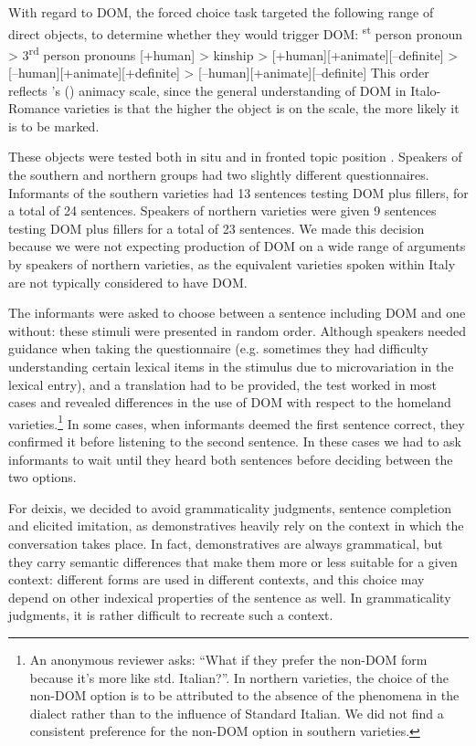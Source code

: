 \documentclass[output=paper,hidelinks]{langscibook}
\begin{document}
With regard to DOM, the forced choice task targeted the following range of direct objects, to determine whether they would trigger DOM: 
\textsuperscript{st} person pronoun > 3\textsuperscript{rd} person pronouns [+human] > kinship > [+human][+animate][--definite] > [--human][+animate][+definite] > [--human][+animate][--definite]
\z
This order reflects \citeauthor{Silverstein1976}’s (\citeyear{Silverstein1976}) animacy scale, since the general understanding of DOM in Italo-Romance varieties is that the higher the object is on the scale, the more likely it is to be marked.

These objects were tested both in situ and in fronted topic position \citep{Rizzi1997}. Speakers of the southern and northern groups had two slightly different questionnaires. Informants of the southern varieties had 13 sentences testing DOM plus fillers, for a total of 24 sentences. Speakers of northern varieties were given 9 sentences testing DOM plus fillers for a total of 23 sentences. We made this decision because we were not expecting production of DOM on a wide range of arguments by speakers of northern varieties, as the equivalent varieties spoken within Italy are not typically considered to have DOM.

The informants were asked to choose between a sentence including DOM and one without: these stimuli were presented in random order. Although speakers needed guidance when taking the questionnaire (e.g. sometimes they had difficulty understanding certain lexical items in the stimulus due to microvariation in the lexical entry), and a translation had to be provided, the test worked in most cases and revealed differences in the use of DOM with respect to the homeland varieties.\footnote{An anonymous reviewer asks: ``What if they prefer the non-DOM form because it’s more like std. Italian?''. In northern varieties, the choice of the non-DOM option is to be attributed to the absence of the phenomena in the dialect rather than to the influence of Standard Italian. We did not find a consistent preference for the non-DOM option in southern varieties.} In some cases, when informants deemed the first sentence correct, they confirmed it before listening to the second sentence. In these cases we had to ask informants to wait until they heard both sentences before deciding between the two options.

For deixis, we decided to avoid grammaticality judgments, sentence completion and elicited imitation, as demonstratives heavily rely on the context in which the conversation takes place. In fact, demonstratives are always grammatical, but they carry semantic differences that make them more or less suitable for a given context: different forms are used in different contexts, and this choice may depend on other indexical properties of the sentence as well. In grammaticality judgments, it is rather difficult to recreate such a context.
\end{document}
